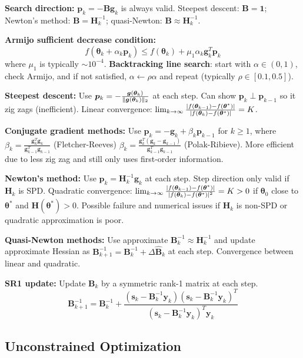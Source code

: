 \documentclass[twocolumn, 8pt]{extarticle}
\begin{document}
\textbf{Search direction:} \(\bm p_k = -\bm B\bm g_k\) is always valid. Steepest descent: $\bm B = \bm 1$; Newton's
method: \(\bm B = \bm H_k^{-1}\); quasi-Newton: \(\bm B \approx \bm H_k^{-1}\).

\textbf{Armijo sufficient decrease condition:} \[f(\bm\theta _k + \alpha _k\bm p_k) \leq f(\bm\theta _k) + \mu _1\alpha
_k\bm g_k^T\bm p_k\] where \(\mu _1\) is typically \(\sim 10^{-4}\). \textbf{Backtracking line search}: start with
$\alpha \in (0, 1)$, check Armijo, and if not satisfied, \(\alpha \gets \rho\alpha\) and repeat (typically \(\rho \in
[0.1, 0.5]\)).

\textbf{Steepest descent:} Use \(\bm p_k = -\frac{\bm g(\bm\theta _k)}{\lVert\bm g(\bm\theta _k)\rVert_2}\) at each step.
Can show \(\bm p_k \perp \bm p_{k - 1}\) so it zig zags (inefficient). Linear convergence:
\(\lim _{k \to \infty} \frac{\lvert f(\bm \theta _{k - 1}) - f(\bm\theta^*)\rvert}{\lvert f(\bm\theta _k) - f(\bm\theta^*)\rvert} = K\).

\textbf{Conjugate gradient methods:} Use \(\bm p_k = -\bm g_k + \beta _k \bm p_{k - 1}\) for \(k \geq1\), where \(\beta
_k = \frac{\bm g_k^T\bm g_k}{\bm g_{k - 1}^T\bm g_{k - 1}}\) (Fletcher-Reeves) \(\beta _k = \frac{\bm g_k^T(\bm g_k -
\bm g_{k - 1})}{\bm g_{k - 1}^T\bm g_{k - 1}}\) (Polak-Ribieve). More efficient due to less zig zag and still only uses
first-order information.

\textbf{Newton's method:} Use \(\bm p_k = \bm H_k^{-1}\bm g_k\) at each step. Step direction only valid if \(\bm H_k\)
is SPD. Quadratic convergence: \(\lim _{k \to \infty} \frac{\lvert f(\bm \theta _{k - 1}) - f(\bm\theta^*)\rvert}{\lvert f(\bm\theta _k) - f(\bm\theta^*)\rvert^2} = K > 0\)
if \(\bm\theta _0\) close to \(\bm\theta^*\) and \(\bm H(\bm\theta^*) > 0\). Possible failure and numerical issues if
\(\bm H_k\) is non-SPD or quadratic approximation is poor.

\textbf{Quasi-Newton methods:} Use approximate \(\bm B_k^{-1} \approx \bm H_k^{-1}\) and update approximate Hessian as
\(\bm B_{k + 1}^{-1} = \bm B_k^{-1} + \Delta\hat{\bm B}_k\) at each step. Convergence between linear and quadratic.

\textbf{SR1 update:} Update \(\bm B_k\) by a symmetric rank-1 matrix at each step. 
\[\bm B_{k + 1}^{-1} = \bm B_k^{-1} + \frac{(\bm s_k - \bm B_k^{-1}\bm y_k)(\bm s_k - \bm B_k^{-1}\bm y_k)^T}{(\bm s_k - \bm B_k^{-1}\bm y_k)^T\bm y_k}\]

\subsection{Unconstrained Optimization} %
\end{document}

